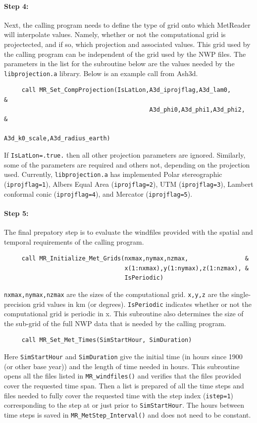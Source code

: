 \documentclass[11pt]{article}   %
\begin{document}
\paragraph{Step 4:} Next, the calling program needs to define the type of grid onto which MetReader 
will interpolate values.  Namely, whether or not the computational grid is projectected, and if so,
which projection and associated values.  This grid used by the calling program can be independent
of the grid used by the NWP files.  The parameters in the list for the subroutine below are the values
needed by the \texttt{libprojection.a} library.  Below is an example call from Ash3d.
\begin{verbatim}
     call MR_Set_CompProjection(IsLatLon,A3d_iprojflag,A3d_lam0,           &
                                         A3d_phi0,A3d_phi1,A3d_phi2,       &
                                         A3d_k0_scale,A3d_radius_earth)
\end{verbatim}
If \texttt{IsLatLon=.true.} then all other projection parameters are ignored.  Similarly,
some of the parameters are required and others not, depending on the projection used.
Currently, \texttt{libprojection.a} has implemented
Polar stereographic (\texttt{iprojflag=1}),
Albers Equal Area (\texttt{iprojflag=2}),
UTM (\texttt{iprojflag=3}),
Lambert conformal conic (\texttt{iprojflag=4}),
and Mercator (\texttt{iprojflag=5}).

\paragraph{Step 5:} The final prepatory step is to evaluate the windfiles provided
with the spatial and temporal requirements of the calling program.
\begin{verbatim}
     call MR_Initialize_Met_Grids(nxmax,nymax,nzmax,                &
                                  x(1:nxmax),y(1:nymax),z(1:nzmax), &
                                  IsPeriodic)
\end{verbatim}
\texttt{nxmax,nymax,nzmax} are the sizes of the computational grid. \texttt{x,y,z} are the
single-precision grid values in km (or degrees).  \texttt{IsPeriodic} indicates whether or
not the computational grid is periodic in x.  This subroutine also determines the size
of the sub-grid of the full NWP data that is needed by the calling program.
\begin{verbatim}
     call MR_Set_Met_Times(SimStartHour, SimDuration)
\end{verbatim}
Here \texttt{SimStartHour} and \texttt{SimDuration} give the initial time (in hours since 1900 (or
other base year)) and the length of time needed in hours.  This subroutine opens all the
files listed in \texttt{MR\_windfiles()} and verifies that the files provided cover the requested
time span.  Then a list is prepared of all the time steps and files needed to fully cover the 
requested time with the step index (\texttt{istep=1}) corresponding to the step at or
just prior to \texttt{SimStartHour}.
The hours between time steps is saved in \texttt{MR\_MetStep\_Interval()} and does not need to
be constant.
\end{document}
